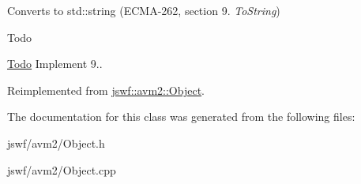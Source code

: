 Converts to {\ttfamily std\+::string} (E\+C\+M\+A-\/262, section 9. {\itshape To\+String}) 

\begin{DoxyRefDesc}{Todo}
\item[\hyperlink{todo__todo000007}{Todo}]Implement 9.. \end{DoxyRefDesc}


Reimplemented from \hyperlink{classjswf_1_1avm2_1_1_object_a69b39776062acaccd2cd2b5a1f937c9d}{jswf\+::avm2\+::\+Object}.



The documentation for this class was generated from the following files\+:\begin{DoxyCompactItemize}
\item 
jswf/avm2/Object.\+h\item 
jswf/avm2/Object.\+cpp\end{DoxyCompactItemize}
